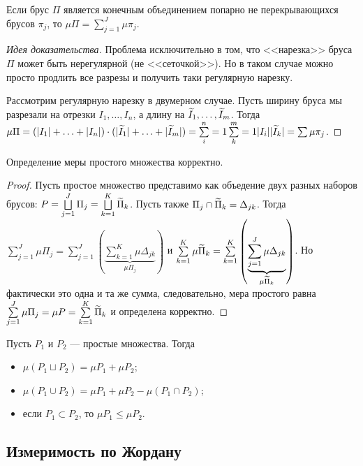 \begin{Statement}
Если брус $\Pi$ является конечным объединением попарно не перекрывающихся брусов $\pi_j$, то $\mu \Pi = \sum\limits^J_{j=1} \mu \pi_j$.
\end{Statement}
\begin{proof}[Идея доказательства]
Проблема исключительно в том, что <<нарезка>> бруса $\Pi$ может быть нерегулярной (не <<сеточкой>>). Но в таком случае можно просто продлить все разрезы и получить таки регулярную нарезку.

Рассмотрим регулярную нарезку в двумерном случае. Пусть ширину бруса мы разрезали на отрезки $I_1, \ldots, I_n$, а длину на $\widetilde{I}_1, \ldots, \widetilde{I}_m$. Тогда $\mu\Pi = (|I_1| + \ldots + |I_n|) \cdot (|\I_1| + \ldots + |\I_m|) \hm= \sum\limits^n_i=1\sum\limits^m_k=1|I_i||\I_k| = \sum\mu\pi_j$.
\end{proof}

\begin{Statement}
Определение меры простого множества корректно.
\end{Statement}
\begin{proof}
Пусть простое множество представимо как объедение двух разных наборов брусов: $P = \bigsqcup\limits^J_{j=1}\Pi_j = \bigsqcup\limits^K_{k=1}\widetilde{\Pi}_k$. Пусть также $\Pi_j \cap \widetilde{\Pi}_k = \Delta_{jk}$. Тогда $\sum\limits^J_{j=1} \mu\Pi_j = \sum\limits^J_{j=1}\left( \underbrace{\sum\limits^K_{k=1} \mu \Delta_{jk}}_{\mu\Pi_j}  \right)$ и $\sum\limits^K_{k=1}\mu \widetilde{\Pi}_k = \sum\limits^K_{k=1}\left( \underbrace{\sum\limits^J_{j=1}\mu \Delta_{jk}}_{\mu\widetilde{\Pi}_k} \right)$. Но фактически это одна и та же сумма, следовательно, мера простого равна $\sum\limits^J_{j=1}\mu\Pi_j = \mu P  = \sum\limits^K_{k=1}\widetilde{\Pi}_k$ и определена корректно.
\end{proof}
\begin{Statement}
Пусть $P_1$ и $P_2$ --- простые множества. Тогда
\begin{itemize}
\item $\mu(P_1 \sqcup P_2) = \mu P_1 + \mu P_2$;
\item $\mu(P_1 \cup P_2) = \mu P_1 + \mu P_2 - \mu(P_1 \cap P_2)$;
\item если $P_1 \subset P_2$, то $\mu P_1 \leq \mu P_2$.
\end{itemize}
\end{Statement}

\subsection{Измеримость по Жордану}

